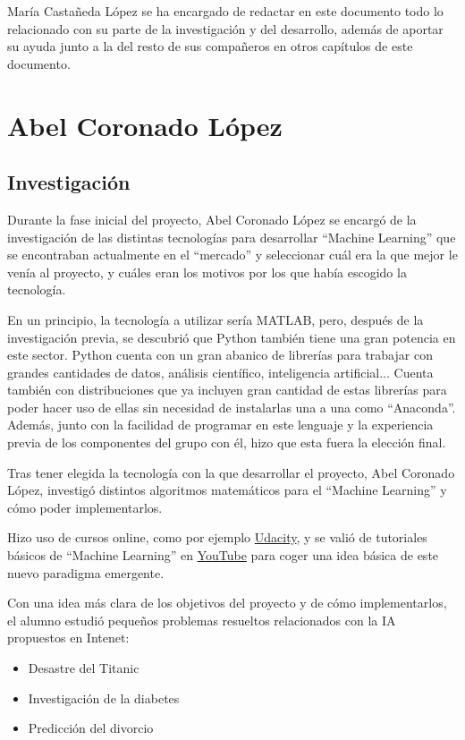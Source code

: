 María Castañeda López se ha encargado de redactar en este documento todo lo relacionado con su parte de la investigación y del desarrollo, además de aportar su ayuda junto a la del resto de sus compañeros en otros capítulos de este documento.




\section{Abel Coronado López}
\subsection{Investigación}

Durante la fase inicial del proyecto, Abel Coronado López se encargó de la investigación de las distintas tecnologías para desarrollar ``Machine Learning'' que se encontraban actualmente en el ``mercado'' y seleccionar cuál era la que mejor le venía al proyecto, y cuáles eran los motivos por los que había escogido la tecnología.

En un principio, la tecnología a utilizar sería MATLAB, pero, después de la investigación previa, se descubrió que Python también tiene una gran potencia en este sector. Python cuenta con un gran abanico de librerías para trabajar con grandes cantidades de datos, análisis científico, inteligencia artificial... Cuenta también con distribuciones que ya incluyen gran cantidad de estas librerías para poder hacer uso de ellas sin necesidad de instalarlas una a una como ``Anaconda''. Además, junto con la facilidad de programar en este lenguaje y la experiencia previa de los componentes del grupo con él, hizo que esta fuera la elección final.

Tras tener elegida la tecnología con la que desarrollar el proyecto, Abel Coronado López, investigó distintos algoritmos matemáticos para el ``Machine Learning'' y cómo poder implementarlos.

Hizo uso de cursos online, como por ejemplo \href{https://www.udacity.com}{Udacity}, y se valió de tutoriales básicos de ``Machine Learning'' en \href{https://www.youtube.com}{YouTube} para coger una idea básica de este nuevo paradigma emergente.

Con una idea más clara de los objetivos del proyecto y de cómo implementarlos, el alumno estudió pequeños problemas resueltos relacionados con la IA propuestos en Intenet:

\begin{itemize}
\item Desastre del Titanic
\item Investigación de la diabetes
\item Predicción del divorcio
\end{itemize}

